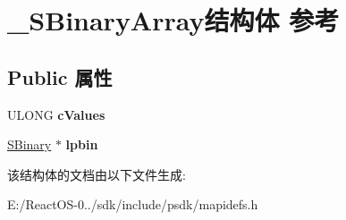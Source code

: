 \hypertarget{struct___s_binary_array}{}\section{\+\_\+\+S\+Binary\+Array结构体 参考}
\label{struct___s_binary_array}
\subsection*{Public 属性}
\begin{DoxyCompactItemize}
\item 
\mbox{\label{struct___s_binary_array_a560cb5b913d44373acc6282383306b15}} 
U\+L\+O\+NG {\bfseries c\+Values}
\item 
\mbox{\label{struct___s_binary_array_aa752cce56e8b06ddc334932035c8a871}} 
\hyperlink{struct___s_binary}{S\+Binary} $\ast$ {\bfseries lpbin}
\end{DoxyCompactItemize}


该结构体的文档由以下文件生成\+:\begin{DoxyCompactItemize}
\item 
E\+:/\+React\+O\+S-\/0../sdk/include/psdk/mapidefs.\+h\end{DoxyCompactItemize}
